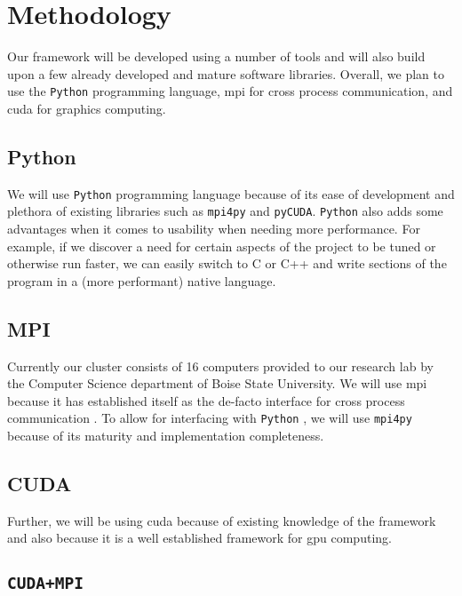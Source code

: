 \section{Methodology}

Our framework will be developed using a number of tools and will also build
upon a few already developed and mature software libraries. Overall, we plan to
use the \texttt{Python} programming language, \gls{mpi} for cross process
communication, and \gls{cuda} for graphics computing.

\subsection{Python}

We will use \texttt{Python} programming language because of its ease of
development and plethora of existing libraries such as \texttt{mpi4py} and
\texttt{pyCUDA}. \texttt{Python} also adds some advantages when it comes to
usability when needing more performance. For example, if we discover a need
for certain aspects of the project to be tuned or otherwise run faster, we can
easily switch to C or C++ and write sections of the program in a (more
performant) native language.

\subsection{MPI}

Currently our cluster consists of 16 computers provided to our research lab by
the Computer Science department of Boise State University. We will use
\gls{mpi} because it has established itself as the de-facto interface for cross
process communication \cite{website:MPI-Tutorial}. To allow for interfacing
with \texttt{Python} \cite{website:mpi-4-python}, we will use \texttt{mpi4py}
because of its maturity and implementation completeness.

\subsection{CUDA}

Further, we will be using \gls{cuda} because of existing knowledge of the
framework and also because it is a well established framework for \gls{gpu}
computing.


\subsection{\texttt{CUDA+MPI}}

